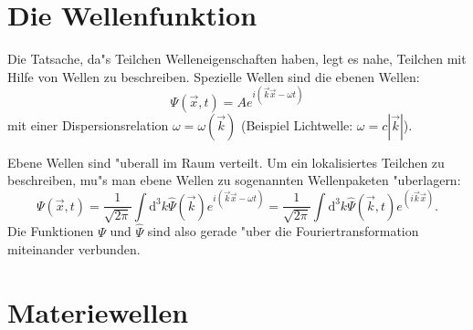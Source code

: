 

\section{Die Wellenfunktion}

Die Tatsache, da"s Teilchen Welleneigenschaften haben, legt es nahe, 
Teilchen mit Hilfe von Wellen zu beschreiben. Spezielle Wellen sind
die ebenen Wellen:
\begin{equation}
\label{eq::ebene_welle}
	\Psi(\vec x,t) = A e^{i(\vec k \vec x -\omega t)}
\end{equation}
mit einer Dispersionsrelation $\omega = \omega(\vec k)$
(Beispiel Lichtwelle: $\omega = c |\vec k|$).

Ebene Wellen sind "uberall im Raum verteilt. Um ein lokalisiertes Teilchen
zu beschreiben, mu"s man ebene Wellen zu sogenannten Wellenpaketen
"uberlagern:
\begin{equation}
	\Psi(\vec x,t) = \frac{1}{\sqrt{2\pi}}\int \mathrm{d}^3k
	\hat \Psi(\vec k)
	e^{i(\vec k \vec x -\omega t)} = \frac{1}{\sqrt{2\pi}}
	\int \mathrm{d}^3 k\hat \Psi(\vec k,t) e^{(i \vec k \vec x)}.
\end{equation}
Die Funktionen $\Psi$ und $\hat \Psi$ sind also gerade "uber die
Fouriertransformation miteinander verbunden. 

\section{Materiewellen}

